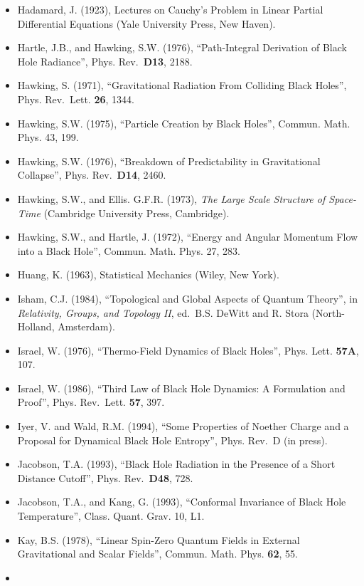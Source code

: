 \documentclass[11pt,a4paper]{article}
\providecommand{\tightlist}{\setlength{\itemsep}{0pt}\setlength{\parskip}{0pt}}
\begin{document}
\begin{itemize}
\tightlist
\item
  Hadamard, J. (1923), Lectures on Cauchy's Problem in Linear Partial Differential Equations (Yale University Press, New Haven).
\item
  Hartle, J.B., and Hawking, S.W. (1976), ``Path-Integral Derivation of Black Hole Radiance'', Phys. Rev.~\textbf{D13}, 2188.
\item
  Hawking, S. (1971), ``Gravitational Radiation From Colliding Black Holes'', Phys. Rev.~Lett. \textbf{26}, 1344.
\item
  Hawking, S.W. (1975), ``Particle Creation by Black Holes'', Commun. Math. Phys. 43, 199.
\item
  Hawking, S.W. (1976), ``Breakdown of Predictability in Gravitational Collapse'', Phys. Rev.~\textbf{D14}, 2460.
\item
  Hawking, S.W., and Ellis. G.F.R. (1973), \emph{The Large Scale Structure of Space-Time} (Cambridge University Press, Cambridge).
\item
  Hawking, S.W., and Hartle, J. (1972), ``Energy and Angular Momentum Flow into a Black Hole'', Commun. Math. Phys. 27, 283.
\item
  Huang, K. (1963), Statistical Mechanics (Wiley, New York).
\item
  Isham, C.J. (1984), ``Topological and Global Aspects of Quantum Theory'', in \emph{Relativity, Groups, and Topology II}, ed.~B.S. DeWitt and R. Stora (North-Holland, Amsterdam).
\item
  Israel, W. (1976), ``Thermo-Field Dynamics of Black Holes'', Phys. Lett. \textbf{57A}, 107.
\item
  Israel, W. (1986), ``Third Law of Black Hole Dynamics: A Formulation and Proof'', Phys. Rev.~Lett. \textbf{57}, 397.
\item
  Iyer, V. and Wald, R.M. (1994), ``Some Properties of Noether Charge and a Proposal for Dynamical Black Hole Entropy'', Phys. Rev.~D (in press).
\item
  Jacobson, T.A. (1993), ``Black Hole Radiation in the Presence of a Short Distance Cutoff'', Phys. Rev.~\textbf{D48}, 728.
\item
  Jacobson, T.A., and Kang, G. (1993), ``Conformal Invariance of Black Hole Temperature'', Class. Quant. Grav. 10, L1.
\item
  Kay, B.S. (1978), ``Linear Spin-Zero Quantum Fields in External Gravitational and Scalar Fields'', Commun. Math. Phys. \textbf{62}, 55.
\item

\end{itemize}
\end{document}
